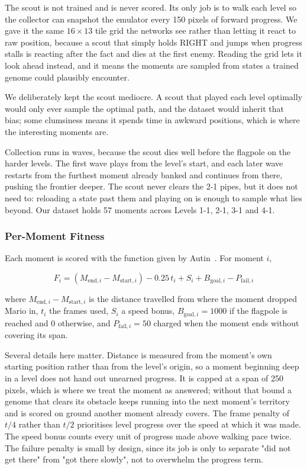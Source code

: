 \noindent
The scout is not trained and is never scored. Its only job is to walk each
level so the collector can snapshot the emulator every 150 pixels of forward
progress. We gave it the same $16 \times 13$ tile grid the networks see rather
than letting it react to raw position, because a scout that simply holds RIGHT
and jumps when progress stalls is reacting after the fact and dies at the first
enemy. Reading the grid lets it look ahead instead, and it means the moments
are sampled from states a trained genome could plausibly encounter.

\noindent
We deliberately kept the scout mediocre. A scout that played each level
optimally would only ever sample the optimal path, and the dataset would
inherit that bias; some clumsiness means it spends time in awkward positions,
which is where the interesting moments are.

\noindent
Collection runs in waves, because the scout dies well before the flagpole on
the harder levels. The first wave plays from the level's start, and each later
wave restarts from the furthest moment already banked and continues from there,
pushing the frontier deeper. The scout never clears the 2-1 pipes, but it does
not need to: reloading a state past them and playing on is enough to sample
what lies beyond. Our dataset holds 57 moments across Levels 1-1, 2-1, 3-1 and
4-1.

\subsubsection{Per-Moment Fitness}

Each moment is scored with the function given by Autin~\cite{autin2024}. For
moment $i$,

\begin{equation}
    F_{i} = \left( M_{\text{end},i} - M_{\text{start},i} \right)
            - 0.25\,t_{i} + S_{i} + B_{\text{goal},i} - P_{\text{fail},i}
    \label{eq:fitness-moment-single}
\end{equation}

\noindent
where $M_{\text{end},i} - M_{\text{start},i}$ is the distance travelled from
where the moment dropped Mario in, $t_i$ the frames used, $S_i$ a speed bonus,
$B_{\text{goal},i} = 1000$ if the flagpole is reached and 0 otherwise, and
$P_{\text{fail},i} = 50$ charged when the moment ends without covering its
span.

\noindent
Several details here matter. Distance is measured from the moment's own
starting position rather than from the level's origin, so a moment beginning
deep in a level does not hand out unearned progress. It is capped at a span of
250 pixels, which is where we treat the moment as answered; without that bound
a genome that clears its obstacle keeps running into the next moment's
territory and is scored on ground another moment already covers. The frame
penalty of $t/4$ rather than $t/2$ prioritises level progress over the speed at
which it was made. The speed bonus counts every unit of progress made above
walking pace twice. The failure penalty is small by design, since its job is
only to separate "did not get there" from "got there slowly", not to overwhelm
the progress term.

